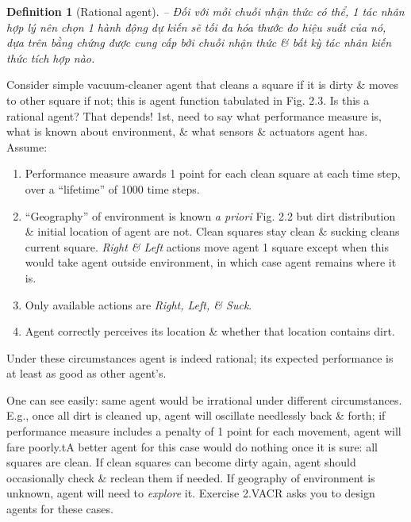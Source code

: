 \documentclass{article}
\newtheorem{definition}{Definition}
\begin{document}
\begin{itemize}
\begin{itemize}
\begin{itemize}
\begin{itemize}
\begin{definition}[Rational agent]
					-- Đối với mỗi chuỗi nhận thức có thể, 1 {\rm tác nhân hợp lý} nên chọn 1 hành động dự kiến sẽ tối đa hóa thước đo hiệu suất của nó, dựa trên bằng chứng được cung cấp bởi chuỗi nhận thức \& bất kỳ tác nhân kiến thức tích hợp nào.
				\end{definition}
				Consider simple vacuum-cleaner agent that cleans a square if it is dirty \& moves to other square if not; this is agent function tabulated in {\sf Fig. 2.3}. Is this a rational agent? That depends! 1st, need to say what performance measure is, what is known about environment, \& what sensors \& actuators agent has. Assume:
				\begin{enumerate}
					\item Performance measure awards 1 point for each clean square at each time step, over a ``lifetime'' of 1000 time steps.
					\item ``Geography'' of environment is known {\it a priori} {\sf Fig. 2.2} but dirt distribution \& initial location of agent are not. Clean squares stay clean \& sucking cleans current square. {\it Right \& Left} actions move agent 1 square except when this would take agent outside environment, in which case agent remains where it is.
					\item Only available actions are {\it Right, Left, \& Suck}.
					\item Agent correctly perceives its location \& whether that location contains dirt.
				\end{enumerate}
				Under these circumstances agent is indeed rational; its expected performance is at least as good as other agent's.
				
				One can see easily: same agent would be irrational under different circumstances. E.g., once all dirt is cleaned up, agent will oscillate needlessly back \& forth; if performance measure includes a penalty of 1 point for each movement, agent will fare poorly.tA better agent for this case would do nothing once it is sure: all squares are clean. If clean squares can become dirty again, agent should occasionally check \& reclean them if needed. If geography of environment is unknown, agent will need to {\it explore} it. Exercise 2.VACR asks you to design agents for these cases.
				

\end{itemize}
\end{itemize}
\end{itemize}
\end{itemize}
\end{document}
